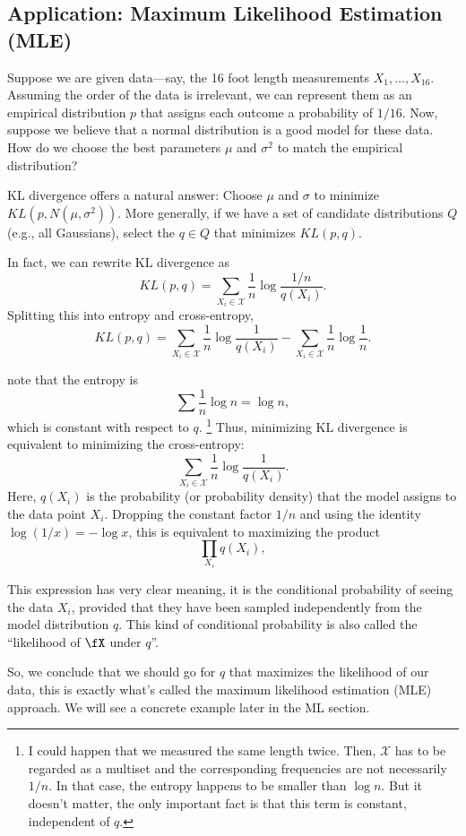 \documentclass{article}
\begin{document}
\subsection{Application: Maximum Likelihood Estimation (MLE)}

Suppose we are given data—say, the 16 foot length measurements \(X_1, \dots, X_{16}\). Assuming the order of the data is irrelevant, we can represent them as an empirical distribution \(p\) that assigns each outcome a probability of \(1/16\). Now, suppose we believe that a normal distribution is a good model for these data. How do we choose the best parameters \(\mu\) and \(\sigma^2\) to match the empirical distribution?

KL divergence offers a natural answer: Choose \(\mu\) and \(\sigma\) to minimize \(KL(p, N(\mu,\sigma^2))\). More generally, if we have a set of candidate distributions \(Q\) (e.g., all Gaussians), select the \(q\in Q\) that minimizes \(KL(p,q)\).

In fact, we can rewrite KL divergence as
\[
KL(p,q)
=\sum_{X_i\in\mathcal{X}} \frac{1}{n}\log\frac{1/n}{q(X_i)}.
\]
Splitting this into entropy and cross-entropy,
\[
KL(p,q)
=
\sum_{X_i\in\mathcal{X}} \frac{1}{n}\log\frac{1}{q(X_i)}
-
\sum_{X_i\in\mathcal{X}} \frac{1}{n}\log\frac{1}{n}.
\]


note that the entropy is
\[
\sum \frac{1}{n}\log n = \log n,
\]
which is constant with respect to \(q\). \footnote{I could happen that we measured the same length twice. Then, $\mathcal{X}$ has to be regarded as a multiset and the corresponding frequencies are not necessarily $1/n$. In that case, the entropy happens to be smaller than $\log n$. But it doesn't matter, the only important fact is that this term is constant, independent of $q$. } Thus, minimizing KL divergence is equivalent to minimizing the cross-entropy:
\[
\sum_{X_i\in\mathcal{X}} \frac{1}{n}\log\frac{1}{q(X_i)}.
\]
Here, \(q(X_i)\) is the probability (or probability density) that the model assigns to the data point \(X_i\). Dropping the constant factor \(1/n\) and using the identity \(\log(1/x)=-\log x\), this is equivalent to maximizing the product
\[
\prod_{X_i} q(X_i),
\]

This expression has very clear meaning, it is the conditional probability of seeing the data $X_i$, provided that they have been sampled independently from the model distribution $q$. This kind of conditional probability is also called the ``likelihood of $\fX$ under $q$''. 

So, we conclude that we should go for $q$ that maximizes the likelihood of our data, this is exactly what's called the maximum likelihood estimation (MLE) approach. We will see a concrete example later in the ML section. 
\end{document}
